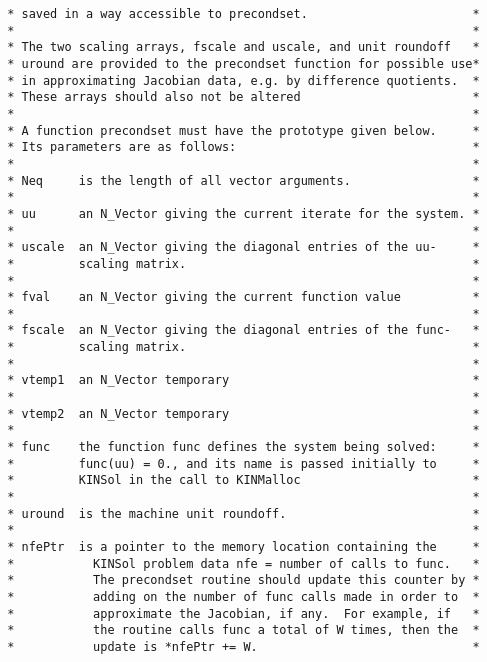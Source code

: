 \begin{verbatim}
 * saved in a way accessible to precondset.                       *
 *                                                                *
 * The two scaling arrays, fscale and uscale, and unit roundoff   *
 * uround are provided to the precondset function for possible use*
 * in approximating Jacobian data, e.g. by difference quotients.  *
 * These arrays should also not be altered                        *
 *                                                                *
 * A function precondset must have the prototype given below.     *
 * Its parameters are as follows:                                 *
 *                                                                *
 * Neq     is the length of all vector arguments.                 *
 *                                                                *
 * uu      an N_Vector giving the current iterate for the system. *
 *                                                                *
 * uscale  an N_Vector giving the diagonal entries of the uu-     *
 *         scaling matrix.                                        *
 *                                                                *
 * fval    an N_Vector giving the current function value          *
 *                                                                *
 * fscale  an N_Vector giving the diagonal entries of the func-   *
 *         scaling matrix.                                        *
 *                                                                *
 * vtemp1  an N_Vector temporary                                  *
 *                                                                *
 * vtemp2  an N_Vector temporary                                  *
 *                                                                *
 * func    the function func defines the system being solved:     *
 *         func(uu) = 0., and its name is passed initially to     *
 *         KINSol in the call to KINMalloc                        *
 *                                                                *
 * uround  is the machine unit roundoff.                          *
 *                                                                *
 * nfePtr  is a pointer to the memory location containing the     *
 *           KINSol problem data nfe = number of calls to func.   *
 *           The precondset routine should update this counter by *
 *           adding on the number of func calls made in order to  *
 *           approximate the Jacobian, if any.  For example, if   *
 *           the routine calls func a total of W times, then the  *
 *           update is *nfePtr += W.                              *

\end{verbatim}
